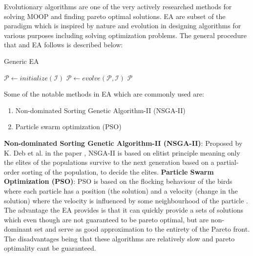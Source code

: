 Evolutionary algorithms are one of the very actively researched methods for solving MOOP and finding pareto optimal solutions. EA are subset of the paradigm which is inspired by nature and evolution in designing algorithms for various purposes including solving optimization problems. The general procedure that and EA follows is described below:
\begin{algorithm}
\caption{Generic EA}\label{algo_generic_ea}
\begin{algorithmic}
 
    \State $\mathcal{P} \gets initialize(\mathcal{I})$ 
     
        \State $\mathcal{P} \gets evolve(\mathcal{P},\mathcal{I})$ 
    \EndWhile
    \Return $\mathcal{P}$
\EndFunction
\end{algorithmic}
\end{algorithm}\newline Some of the notable methods in EA which are commonly used are:
\begin{enumerate}
    \item Non-dominated Sorting Genetic Algorithm-II (NSGA-II)
    \item Particle swarm optimization (PSO)
\end{enumerate} 
\textbf{Non-dominated Sorting Genetic Algorithm-II (NSGA-II)}: \label{nsga_2} Proposed by K. Deb et al. in the paper \cite{deb2002fast}, NSGA-II is based on elitist principle meaning only the elites of the populations survive to the next generation based on a partial-order sorting of the population, to decide the elites.
\newline\newline \textbf{Particle Swarm Optimization (PSO)}: \label{partical_swarm_opt} PSO is based on the flocking behaviour of the birds where each particle has a position (the solution) and a velocity (change in the solution) where the velocity is influenced by some neighbourhood of the particle \cite{poli2007particle}.
\newline\newline The advantage the EA provides is that it can quickly provide a sets of solutions which even though are not guaranteed to be pareto optimal, but are non-dominant set and serve as good approximation to the entirety of the Pareto front. The disadvantages being that these algorithms are relatively slow and pareto optimality cant be guaranteed.

